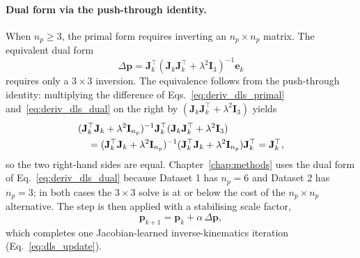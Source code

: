\paragraph{Dual form via the push-through identity.}
When $n_{p} \ge 3$, the primal form requires inverting an $n_{p} \times n_{p}$ matrix. The equivalent dual form
\begin{equation}
  \Delta \mathbf{p} = \mathbf{J}_{k}^{\top} (\mathbf{J}_{k} \mathbf{J}_{k}^{\top} + \lambda^{2} \mathbf{I}_{3})^{-1} \mathbf{e}_{k}
  \label{eq:deriv_dls_dual}
\end{equation}
requires only a $3 \times 3$ inversion. The equivalence follows from the push-through identity: multiplying the difference of Eqs.~\eqref{eq:deriv_dls_primal} and~\eqref{eq:deriv_dls_dual} on the right by $(\mathbf{J}_{k} \mathbf{J}_{k}^{\top} + \lambda^{2} \mathbf{I}_{3})$ yields
\begin{align}
  & (\mathbf{J}_{k}^{\top} \mathbf{J}_{k} + \lambda^{2} \mathbf{I}_{n_{p}})^{-1} \mathbf{J}_{k}^{\top} (\mathbf{J}_{k} \mathbf{J}_{k}^{\top} + \lambda^{2} \mathbf{I}_{3}) \notag \\
  & \quad = (\mathbf{J}_{k}^{\top} \mathbf{J}_{k} + \lambda^{2} \mathbf{I}_{n_{p}})^{-1} (\mathbf{J}_{k}^{\top} \mathbf{J}_{k} + \lambda^{2} \mathbf{I}_{n_{p}}) \mathbf{J}_{k}^{\top} = \mathbf{J}_{k}^{\top},
\end{align}
so the two right-hand sides are equal. Chapter~\ref{chap:methods} uses the dual form of Eq.~\eqref{eq:deriv_dls_dual} because Dataset 1 has $n_{p} = 6$ and Dataset 2 has $n_{p} = 3$; in both cases the $3 \times 3$ solve is at or below the cost of the $n_{p} \times n_{p}$ alternative. The step is then applied with a stabilising scale factor,
\begin{equation}
  \mathbf{p}_{k+1} = \mathbf{p}_{k} + \alpha \, \Delta \mathbf{p},
  \label{eq:deriv_dls_update}
\end{equation}
which completes one Jacobian-learned inverse-kinematics iteration (Eq.~\eqref{eq:dls_update}).
